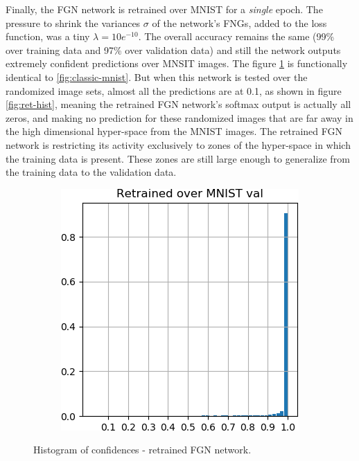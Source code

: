 \documentclass[12pt,oneside]{CUNY_PhD}
\begin{document}
Finally, the FGN network is retrained over MNIST for a \emph{single} epoch. The pressure to shrink the variances $\sigma$ of the network's FNGs, added to the loss function, was a tiny $\lambda=10e^{-10}$. The overall accuracy remains the same (99\% over training data and 97\% over validation data) and still the network outputs extremely confident predictions over MNSIT images. The figure \ref{fig:retrained-mnist} is functionally identical to \ref{fig:classic-mnist}. But when this network is tested over the randomized image sets, almost all the predictions are at 0.1, as shown in figure \ref{fig:ret-hist}, meaning the retrained FGN network's softmax output is actually all zeros, and making no prediction for these randomized images that are far away in the high dimensional hyper-space from the MNIST images. The retrained FGN network is restricting its activity exclusively to zones of the hyper-space in which the training data is present. These zones are still large enough to generalize from the training data to the validation data.
\begin{figure}[!h]
    \centering
    \begin{subfigure}[t]{0.49\textwidth}
        \includegraphics[width=\textwidth]{images/mnist-behavior/retrained-hist-val.png}
    \end{subfigure}
    \caption{Histogram of confidences - retrained FGN network.}
    \label{fig:retrained-mnist}
\end{figure}
\end{document}
